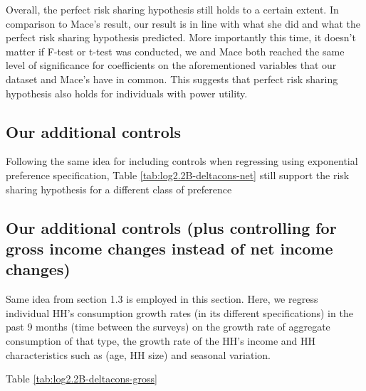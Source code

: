 \documentclass[12pt,a4paper]{article}
\begin{document}
Overall, the perfect risk sharing hypothesis still holds to a certain extent. In comparison to Mace's result, our result is in line with what she did and what the perfect risk sharing hypothesis predicted. More importantly this time, it doesn't matter if F-test or t-test was conducted, we and Mace both reached the same level of significance for coefficients on the aforementioned variables that our dataset and Mace's have in common. This suggests that perfect risk sharing hypothesis also holds for individuals with power utility. 


\subsection*{Our additional controls}

Following the same idea for including controls when regressing using exponential preference specification,  Table \ref{tab:log2.2B-deltacons-net} still support the risk sharing hypothesis for a different class of preference 


\subsection*{Our additional controls (plus controlling for gross income changes instead of net income changes)}

Same idea from section 1.3 is employed in this section. Here, we regress individual HH's consumption growth rates (in its different specifications) in the past 9 months (time between the surveys) on the growth rate of aggregate consumption of that type, the growth rate of the HH's income and HH characteristics such as (age, HH size) and seasonal variation. 

Table \ref{tab:log2.2B-deltacons-gross}


\clearpage
{}


\end{document}
